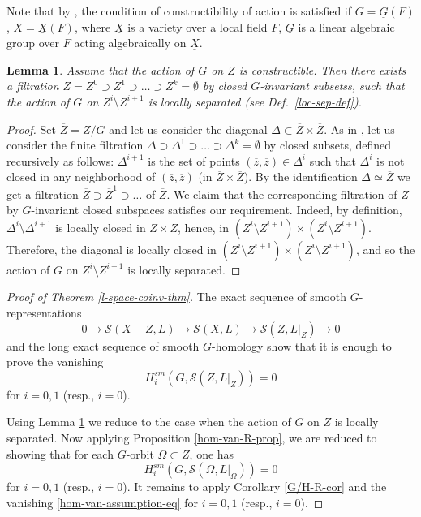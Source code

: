 \documentclass[12pt,reqno]{amsart}
\newtheorem{lemma}[theorem]{Lemma}
\theoremstyle{definition}
\theoremstyle{remark}
\numberwithin{equation}{section}
\newcommand{\De}{\Delta}
\newcommand{\und}{\underline}
\newcommand{\Om}{\Omega}
\renewcommand{\SS}{{\mathcal S}}
\newcommand{\sub}{\subset}
\newcommand{\ov}{\overline}
\begin{document}
Note that by  \cite[Sec.\ 6.15]{BZ}, the condition of constructibility of action is satisfied if $G=\und{G}(F)$, $X=\und{X}(F)$, where $\und{X}$ is a variety over a local field $F$,
$\und{G}$ is a linear algebraic group over $F$ acting algebraically on $\und{X}$.

\begin{lemma}\label{constructible-lem} 
Assume that the action of $G$ on $Z$ is constructible. Then there exists a filtration $Z=Z^0\supset Z^1\supset\ldots\supset Z^k=\emptyset$
by closed $G$-invariant subsetss, such that the action of $G$ on $Z^i\setminus Z^{i+1}$ is locally separated (see Def.\ \ref{loc-sep-def}).
\end{lemma}

\begin{proof}
Set $\ov{Z}=Z/G$ and let us consider the diagonal $\De\sub \ov{Z}\times \ov{Z}$. As in \cite[Sec.\ 6.7]{BZ}, let us consider the finite filtration
$\De\supset \De^1\supset\ldots\supset \De^k=\emptyset$ by closed subsets, defined recursively as follows: $\De^{i+1}$ is the set of points $(\ov{z},\ov{z})\in \De^i$ such that
$\De^i$ is not closed in any neighborhood of $(\ov{z},\ov{z})$ (in $\ov{Z}\times \ov{Z}$).
By the identification $\De\simeq \ov{Z}$ we get a filtration $\ov{Z}\supset \ov{Z}^1\supset\ldots$ of $\ov{Z}$.
We claim that the corresponding filtration of $Z$ by $G$-invariant closed subspaces satisfies our requirement.
Indeed, by definition, $\De^i\setminus \De^{i+1}$ is locally closed in $\ov{Z}\times \ov{Z}$, hence, in $(Z^i\setminus Z^{i+1})\times (Z^i\setminus Z^{i+1})$. 
Therefore, the diagonal is locally closed in $(Z^i\setminus Z^{i+1})\times (Z^i\setminus Z^{i+1})$, and so the action of $G$ on $Z^i\setminus Z^{i+1}$ is
locally separated.
\end{proof}

\begin{proof}[Proof of Theorem \ref{l-space-coinv-thm}] 
The exact sequence of smooth $G$-representations
$$0\to \SS(X-Z,L)\to \SS(X,L)\to \SS(Z,L|_Z)\to 0$$
and the long exact sequence of smooth $G$-homology show that it is enough to prove the vanishing
$$H_i^{sm}(G,\SS(Z,L|_Z))=0$$
for $i=0,1$ (resp., $i=0$).

Using Lemma \ref{constructible-lem} we reduce to the case when the action of $G$ on $Z$ is locally separated.
Now applying Proposition \ref{hom-van-R-prop}, we are reduced to showing that for each $G$-orbit $\Om\sub Z$, one has
$$H_i^{sm}(G,\SS(\Om,L|_\Om))=0$$
for $i=0,1$ (resp., $i=0$).
It remains to apply Corollary \ref{G/H-R-cor} and the vanishing \eqref{hom-van-assumption-eq} for $i=0,1$ (resp., $i=0$).
\end{proof}
\end{document}

